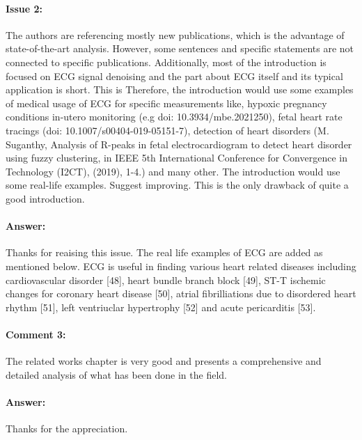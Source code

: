 \documentclass{article}
\begin{document}
\paragraph{Issue 2:}
\begin{displayquote}
The authors are referencing mostly new publications, which is the advantage of state-of-the-art analysis. However, some sentences and specific statements are not connected to specific publications.
Additionally, most of the introduction is focused on ECG signal denoising and the part about ECG itself and its typical application is short. This is Therefore, the introduction would use some examples of medical usage of ECG for specific measurements like, hypoxic pregnancy conditions in-utero monitoring (e.g doi: 10.3934/mbe.2021250), fetal heart rate tracings (doi: 10.1007/s00404-019-05151-7), detection of heart disorders (M. Suganthy, Analysis of R-peaks in fetal electrocardiogram to detect heart disorder using fuzzy clustering, in IEEE 5th International Conference for Convergence in Technology (I2CT), (2019), 1-4.) and many other. The introduction would use some real-life examples. Suggest improving. This is the only drawback of quite a good introduction.
\end{displayquote}

\paragraph{Answer:}
Thanks for reaising this issue. The real life examples of ECG are added as mentioned below.
ECG is useful in finding various heart related diseases including cardiovascular disorder [48], heart bundle branch block [49], ST-T ischemic changes for coronary heart disease [50], atrial fibrilliations due to disordered heart rhythm [51], left ventriuclar hypertrophy [52] and acute pericarditis [53]. 

\paragraph{Comment 3:}
\begin{displayquote}
The related works chapter is very good and presents a comprehensive and detailed analysis of what has been done in the field.
\end{displayquote}

\paragraph{Answer:}
Thanks for the appreciation. 
\end{document}
